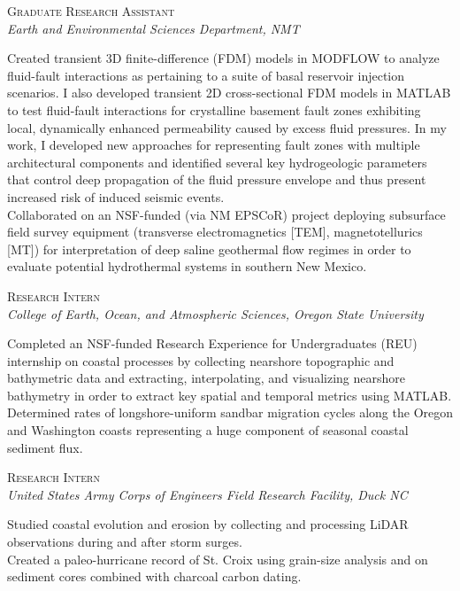 \documentclass[11pt, letterpaper]{article}
\newcommand{\years}[1]{\marginnote{\scriptsize #1}}
\begin{document}
\years{2016 - 2017}\textsc{Graduate Research Assistant}\\
\textit{Earth and Environmental Sciences Department, NMT}
\begin{adjustwidth}{5pt}{0pt}
	Created transient 3D finite-difference (FDM) models in MODFLOW to analyze fluid-fault interactions as pertaining to a suite of basal reservoir injection scenarios. I also developed transient 2D cross-sectional FDM models in MATLAB to test fluid-fault interactions for crystalline basement fault zones exhibiting local, dynamically enhanced permeability caused by excess fluid pressures. In my work, I developed new approaches for representing fault zones with multiple architectural components and identified several key hydrogeologic parameters that control deep propagation of the fluid pressure envelope and thus present increased risk of induced seismic events.\\
	Collaborated on an NSF-funded (via NM EPSCoR) project deploying subsurface field survey equipment (transverse electromagnetics [TEM], magnetotellurics [MT]) for interpretation of deep saline geothermal flow regimes in order to evaluate potential hydrothermal systems in southern New Mexico.
\end{adjustwidth}

\years{2013}\textsc{Research Intern}\\
\textit{College of Earth, Ocean, and Atmospheric Sciences, Oregon State University}
\begin{adjustwidth}{5pt}{0pt}
	Completed an NSF-funded Research Experience for Undergraduates (REU) internship on coastal processes by collecting nearshore topographic and bathymetric data and extracting, interpolating, and visualizing nearshore bathymetry in order to extract key spatial and temporal metrics using MATLAB. Determined rates of longshore-uniform sandbar migration cycles along the Oregon and Washington coasts representing a huge component of seasonal coastal sediment flux.
\end{adjustwidth}

\years{2013}\textsc{Research Intern}\\
\textit{United States Army Corps of Engineers Field Research Facility, Duck NC}
\begin{adjustwidth}{5pt}{0pt}
	Studied coastal evolution and erosion by collecting and processing LiDAR observations during and after storm surges.\\
	Created a paleo-hurricane record of St. Croix using grain-size analysis and on sediment cores combined with charcoal carbon dating.
\end{adjustwidth}
\end{document}
